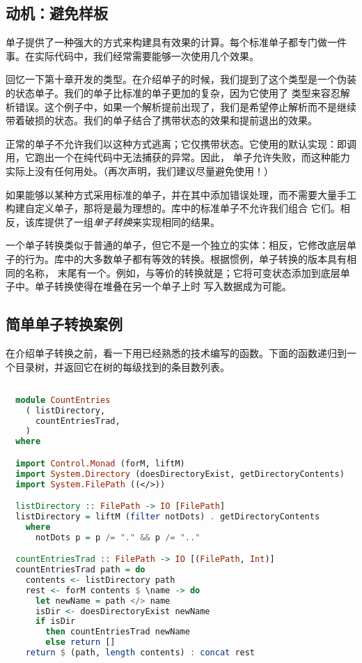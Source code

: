 \documentclass[./main.tex]{subfiles}
\begin{document}
\subsection*{动机：避免样板}

单子提供了一种强大的方式来构建具有效果的计算。每个标准单子都专门做一件事。在实际代码中，我们经常需要能够一次使用几个效果。

回忆一下第十章开发的类型。在介绍单子的时候，我们提到了这个类型是一个伪装的状态单子。我们的单子比标准的单子更加的复杂，因为它使用了
类型来容忍解析错误。这个例子中，如果一个解析提前出现了，我们是希望停止解析而不是继续带着破损的状态。我们的单子结合了携带状态的效果和提前退出的效果。

正常的单子不允许我们以这种方式逃离；它仅携带状态。它使用的默认实现：即调用，它跑出一个在纯代码中无法捕获的异常。因此，
单子允许失败，而这种能力实际上没有任何用处。（再次声明，我们建议尽量避免使用！）

如果能够以某种方式采用标准的单子，并在其中添加错误处理，而不需要大量手工构建自定义单子，那将是最为理想的。库中的标准单子不允许我们组合
它们。相反，该库提供了一组\textit{单子转换}来实现相同的结果。

一个单子转换类似于普通的单子，但它不是一个独立的实体：相反，它修改底层单子的行为。库中的大多数单子都有等效的转换。根据惯例，单子转换的版本具有相同的名称，
末尾有一个。例如，与等价的转换就是；它将可变状态添加到底层单子中。单子转换使得在堆叠在另一个单子上时
写入数据成为可能。

\subsection*{简单单子转换案例}

在介绍单子转换之前，看一下用已经熟悉的技术编写的函数。下面的函数递归到一个目录树，并返回它在树的每级找到的条目数列表。

\begin{lstlisting}[language=Haskell]

  module CountEntries
    ( listDirectory,
      countEntriesTrad,
    )
  where

  import Control.Monad (forM, liftM)
  import System.Directory (doesDirectoryExist, getDirectoryContents)
  import System.FilePath ((</>))

  listDirectory :: FilePath -> IO [FilePath]
  listDirectory = liftM (filter notDots) . getDirectoryContents
    where
      notDots p = p /= "." && p /= ".."

  countEntriesTrad :: FilePath -> IO [(FilePath, Int)]
  countEntriesTrad path = do
    contents <- listDirectory path
    rest <- forM contents $ \name -> do
      let newName = path </> name
      isDir <- doesDirectoryExist newName
      if isDir
        then countEntriesTrad newName
        else return []
    return $ (path, length contents) : concat rest
\end{lstlisting}
\end{document}
